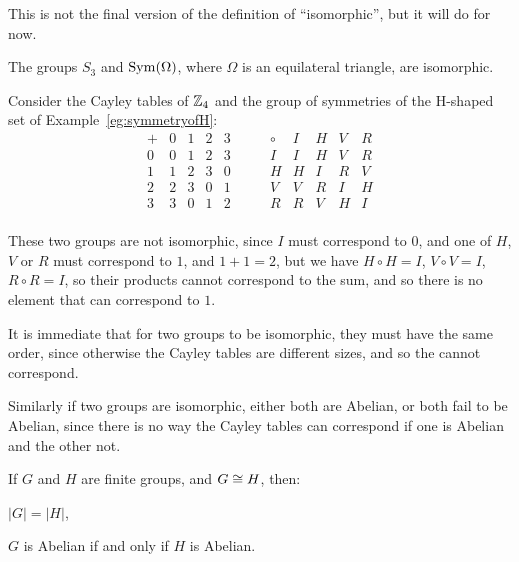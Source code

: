 This is not the final version of the definition of ``isomorphic'', but it will
do for now.

\begin{example}
  The groups $S_{3}$ and $\operatorname{Sym}(\Omega)$, where $\Omega$ is an equilateral
  triangle, are isomorphic.
\end{example}

\begin{example}\label{eg:groupsoforder4}
  Consider the Cayley tables of $\mathbb{Z}_{4}$ and the group of symmetries
  of the \textsf{H}-shaped set of Example~\ref{eg:symmetryofH}:
  \[
    \begin{array}{c|cccc}
      + & 0 & 1 & 2 & 3\\
      \hline
      0 & 0 & 1 & 2 & 3 \\
      1 & 1 & 2 & 3 & 0 \\
      2 & 2 & 3 & 0 & 1 \\
      3 & 3 & 0 & 1 & 2 \\
    \end{array}
    \qquad
    \begin{array}{c|cccc}
    \circ & I & H & V & R \\
    \hline
      I & I & H & V & R \\
      H & H & I & R & V \\
      V & V & R & I & H \\
      R & R & V & H & I \\
    \end{array}
  \]
  
  These two groups are not isomorphic, since $I$ must correspond to $0$, and
  one of $H$, $V$ or $R$ must correspond to $1$, and $1 + 1 = 2$, but we have
  $H \circ H = I$, $V \circ V = I$,  $R \circ R = I$, so their products cannot
  correspond to the sum, and so there is no element that can correspond to $1$.
\end{example}

It is immediate that for two groups to be isomorphic, they must have the same
order, since otherwise the Cayley tables are different sizes, and so the cannot
correspond.

Similarly if two groups are isomorphic, either both are Abelian, or 
both fail to be Abelian, since there is no way the Cayley tables can 
correspond if one is Abelian and the other not.

\begin{lemma}
  If $G$ and $H$ are finite groups, and $G \cong H$, then:
  \begin{theoremenum}
      \item $|G| = |H|$,
      
      \item $G$ is Abelian if and only if $H$ is Abelian.
  \end{theoremenum}
\end{lemma}

